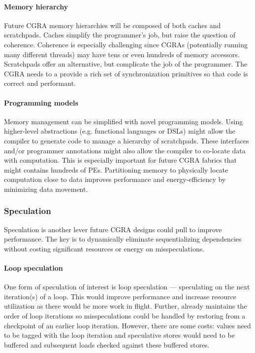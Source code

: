 \paragraph{Memory hierarchy}
Future CGRA memory hierarchies will be composed of both caches and scratchpads.
% 
Caches simplify the programmer's job, but raise the question of coherence.
% 
Coherence is especially challenging since CGRAs (potentially running many different threads) may have tens or even hundreds of memory accessors.
% 
Scratchpads offer an alternative, but complicate the job of the programmer.
% 
The CGRA needs to a provide a rich set of synchronization primitives so that code is correct and performant.

\paragraph{Programming models}
Memory management can be simplified with novel programming models.
% 
Using higher-level abstractions (e.g. functional languages or DSLs) might allow the compiler to generate code to manage a hierarchy of scratchpads.
%
These interfaces and/or programmer annotations might also allow the compiler to co-locate data with computation.
% 
This is especially important for future CGRA fabrics that might contains hundreds of PEs.
% 
Partitioning memory to physically locate computation close to data improves performance and energy-efficiency by minimizing data movement.

\subsubsection{Speculation}
Speculation is another lever future CGRA designs could pull to improve performance.
%
The key is to dynamically eliminate sequentializing dependencies without costing significant resources or energy on misspeculations.

\paragraph{Loop speculation}
One form of speculation of interest is loop speculation --- speculating on the next iteration(s) of a loop.
% 
This would improve performance and increase resource utilization as there would be more work in flight.
% 
Further, \riptide already maintains the order of loop iterations so misspeculations could be handled by restoring from a checkpoint of an earlier loop iteration.
% 
However, there are some costs: values need to be tagged with the loop iteration and speculative stores would need to be buffered and subsequent loads checked against these buffered stores.

